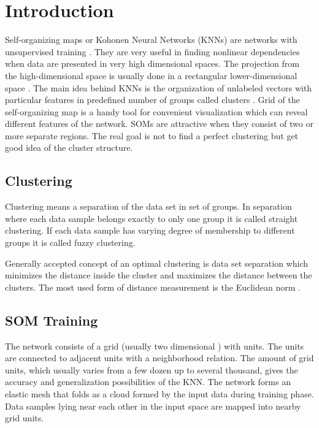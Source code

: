 \documentclass[runningheads]{llncs}
\begin{document}
\section{Introduction}

Self-organizing maps or Kohonen Neural Networks (KNNs) are networks with unsupervised training \cite{schreck01}. They are very useful in finding nonlinear dependencies when data are presented in very high dimensional spaces. The projection from the high-dimensional space is usually done in a rectangular lower-dimensional space \cite{macq01}. The main idea behind KNNs is the organization of unlabeled vectors with particular features in predefined number of groups called clusters \cite{cottrell01}. Grid of the self-organizing map is a handy tool for convenient visualization which can reveal different features of the network. SOMs are attractive when they consist of two or more separate regions. The real goal is not to find a perfect clustering but get good idea of the cluster structure. 

\subsection{Clustering}

Clustering means a separation of the data set in set of groups. In separation where each data sample belongs exactly to only one group it is called straight clustering. If each data sample has varying degree of membership to different groups it is called fuzzy clustering.

Generally accepted concept of an optimal clustering is data set separation which minimizes the distance inside the cluster and maximizes the distance between the clusters. The most used form of distance measurement is the Euclidean norm \cite{lozano01}. 

\subsection{SOM Training}

The network consists of a grid (usually two dimensional \cite{wehrens01}) with units. The units are connected to adjacent units with a neighborhood relation. The amount of grid units, which usually varies from a few dozen up to several thousand, gives the accuracy and generalization possibilities of the KNN. The network forms an elastic mesh that folds as a cloud formed by the input data during training phase. Data samples lying near each other in the input space are mapped into nearby grid units. 
\end{document}
